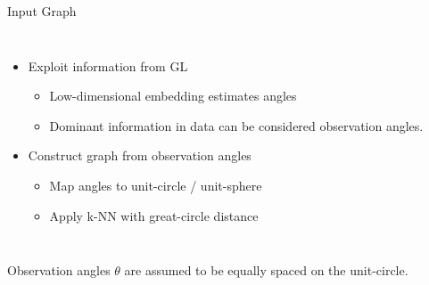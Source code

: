 \begin{frame}{Input Graph}
  \pause
  \begin{columns}
    \begin{itemize}
      \item Exploit information from GL
      \begin{itemize}
        \item Low-dimensional embedding estimates angles
        \item Dominant information in data can be considered observation angles.
      \end{itemize}
      \item<3-> \alert<3>{Construct graph from observation angles}
      \begin{itemize}
        \item<4-> Map angles to unit-circle / unit-sphere
        \item<5-> Apply k-NN with great-circle distance
      \end{itemize}
    \end{itemize}


    
  \end{columns}
  

  \begin{tcolorbox}[colback=red!5!white,hide=<1-5>, alert=<6>, colframe=red!75!black]
    Observation angles $\theta$ are assumed to be equally spaced on the unit-circle.
\end{tcolorbox}
\end{frame}

